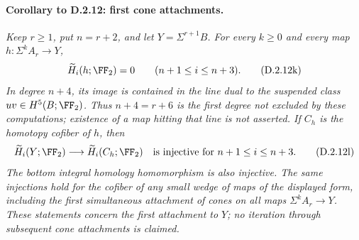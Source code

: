 \paragraph*{Corollary to D.2.12: first cone attachments.}
\begingroup\itshape
Keep $r\geq1$, put $n=r+2$, and let $Y=\Sigma^{r+1}B$.
For every $k\geq0$ and every map $h:\Sigma^kA_r\to Y$,
\[
 \widetilde H_i(h;\FF_2)=0
 \qquad(n+1\leq i\leq n+3).
 \tag{D.2.12k}
\]
In degree $n+4$, its image is contained in the line dual to
the suspended class $uv\in H^5(B;\FF_2)$.
Thus $n+4=r+6$ is the first degree not excluded by these
computations; existence of a map hitting that line is not asserted.
If $C_h$ is the homotopy cofiber of $h$, then
\[
 \widetilde H_i(Y;\FF_2)\longrightarrow
 \widetilde H_i(C_h;\FF_2)
 \quad\hbox{is injective for }n+1\leq i\leq n+3.
 \tag{D.2.12l}
\]
The bottom integral homology homomorphism is also injective.
The same injections hold for the cofiber of any small wedge
of maps of the displayed form, including the first simultaneous
attachment of cones on all maps $\Sigma^kA_r\to Y$.
These statements concern the first attachment to $Y$; no
iteration through subsequent cone attachments is claimed.
\par\endgroup
